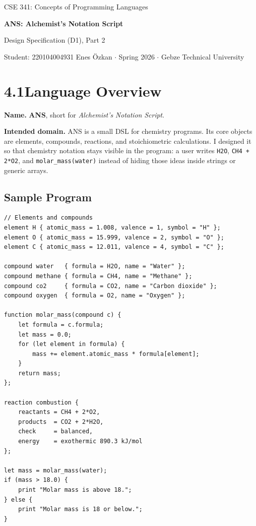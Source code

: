 \documentclass[11pt,a4paper]{article}
\newcommand{\code}[1]{\texttt{#1}}
\begin{document}
\begin{center}
  {\footnotesize\color{anscaption}CSE 341: Concepts of Programming Languages\par}
  \vspace{3pt}
  {\huge\bfseries\sffamily ANS: Alchemist's Notation Script\par}
  \vspace{4pt}
  {\large Design Specification (D1), Part 2\par}
  \vspace{6pt}
  {\footnotesize\color{anscaption}
    Student: 220104004931 Enes Özkan \(\cdot\)
    Spring 2026 \(\cdot\)
    Gebze Technical University\par}
\end{center}
\vspace{7pt}

\section{4.1\quad Language Overview}

\textbf{Name.} \textbf{ANS}, short for \textit{Alchemist's Notation Script}.

\textbf{Intended domain.} ANS is a small DSL for chemistry programs. Its core objects are
elements, compounds, reactions, and stoichiometric calculations. I designed it so that chemistry
notation stays visible in the program: a user writes \code{H2O}, \code{CH4 + 2*O2}, and
\code{molar\_mass(water)} instead of hiding those ideas inside strings or generic arrays.

\subsection{Sample Program}
\begin{lstlisting}[style=ans]
// Elements and compounds
element H { atomic_mass = 1.008, valence = 1, symbol = "H" };
element O { atomic_mass = 15.999, valence = 2, symbol = "O" };
element C { atomic_mass = 12.011, valence = 4, symbol = "C" };

compound water   { formula = H2O, name = "Water" };
compound methane { formula = CH4, name = "Methane" };
compound co2     { formula = CO2, name = "Carbon dioxide" };
compound oxygen  { formula = O2, name = "Oxygen" };

function molar_mass(compound c) {
    let formula = c.formula;
    let mass = 0.0;
    for (let element in formula) {
        mass += element.atomic_mass * formula[element];
    }
    return mass;
};

reaction combustion {
    reactants = CH4 + 2*O2,
    products  = CO2 + 2*H2O,
    check     = balanced,
    energy    = exothermic 890.3 kJ/mol
};

let mass = molar_mass(water);
if (mass > 18.0) {
    print "Molar mass is above 18.";
} else {
    print "Molar mass is 18 or below.";
}
\end{lstlisting}
\end{document}

